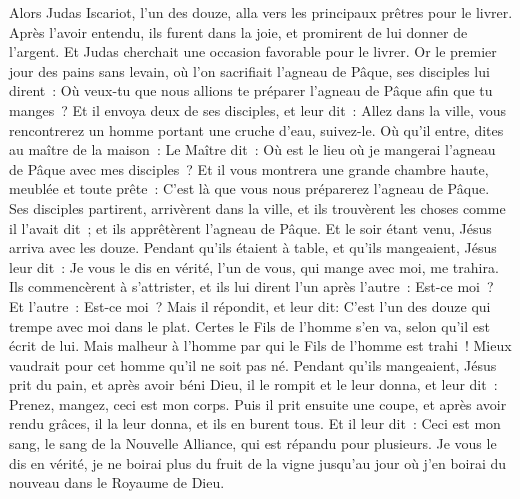 \begin{multicols}{2}
Alors Judas Iscariot, l'un des douze, alla vers les principaux prêtres pour le livrer.
Après l'avoir entendu, ils furent dans la joie, et promirent de lui donner de l'argent. Et Judas cherchait une occasion favorable pour le livrer.
Or le premier jour des pains sans levain, où l'on sacrifiait l'agneau de Pâque, ses disciples lui dirent~: Où veux-tu que nous allions te préparer l'agneau de Pâque afin que tu manges~?
Et il envoya deux de ses disciples, et leur dit~: Allez dans la ville, vous rencontrerez un homme portant une cruche d'eau, suivez-le.
Où qu'il entre, dites au maître de la maison~: Le Maître dit~: Où est le lieu où je mangerai l'agneau de Pâque avec mes disciples~?
Et il vous montrera une grande chambre haute, meublée et toute prête~: C'est là que vous nous préparerez l'agneau de Pâque.
Ses disciples partirent, arrivèrent dans la ville, et ils trouvèrent les choses comme il l'avait dit~; et ils apprêtèrent l'agneau de Pâque.
Et le soir étant venu, Jésus arriva avec les douze.
Pendant qu'ils étaient à table, et qu'ils mangeaient, Jésus leur dit~: Je vous le dis en vérité, l'un de vous, qui mange avec moi, me trahira.
Ils commencèrent à s'attrister, et ils lui dirent l'un après l'autre~: Est-ce moi~? Et l'autre~: Est-ce moi~?
Mais il répondit, et leur dit: C'est l'un des douze qui trempe avec moi dans le plat.
Certes le Fils de l'homme s'en va, selon qu'il est écrit de lui. Mais malheur à l'homme par qui le Fils de l'homme est trahi~! Mieux vaudrait pour cet homme qu'il ne soit pas né.
Pendant qu'ils mangeaient, Jésus prit du pain, et après avoir béni Dieu, il le rompit et le leur donna, et leur dit~: Prenez, mangez, ceci est mon corps.
Puis il prit ensuite une coupe, et après avoir rendu grâces, il la leur donna, et ils en burent tous.
Et il leur dit~: Ceci est mon sang, le sang de la Nouvelle Alliance, qui est répandu pour plusieurs.
Je vous le dis en vérité, je ne boirai plus du fruit de la vigne jusqu'au jour où j'en boirai du nouveau dans le Royaume de Dieu.

\end{multicols}
